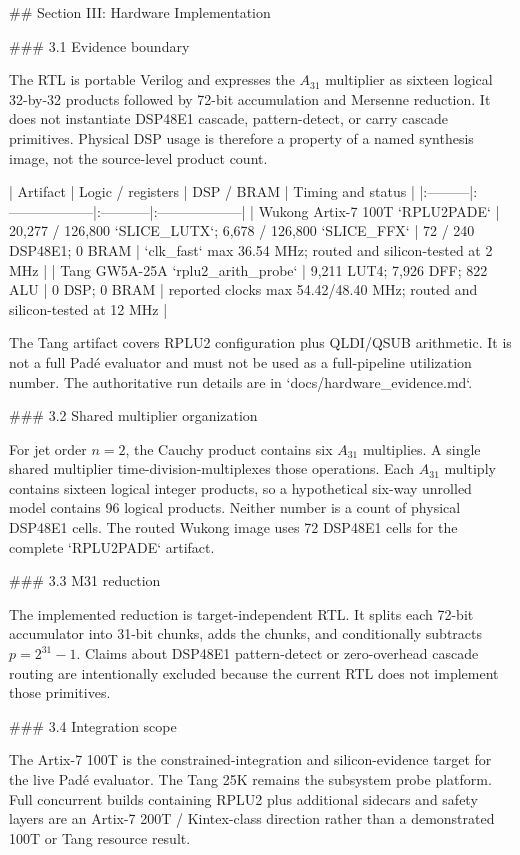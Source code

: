 ## Section III: Hardware Implementation

### 3.1 Evidence boundary

The RTL is portable Verilog and expresses the $A_{31}$ multiplier as sixteen
logical 32-by-32 products followed by 72-bit accumulation and Mersenne
reduction. It does not instantiate DSP48E1 cascade, pattern-detect, or carry
cascade primitives. Physical DSP usage is therefore a property of a named
synthesis image, not the source-level product count.

| Artifact | Logic / registers | DSP / BRAM | Timing and status |
|:---------|:------------------|:-----------|:------------------|
| Wukong Artix-7 100T `RPLU2PADE` | 20,277 / 126,800 `SLICE_LUTX`; 6,678 / 126,800 `SLICE_FFX` | 72 / 240 DSP48E1; 0 BRAM | `clk_fast` max 36.54 MHz; routed and silicon-tested at 2 MHz |
| Tang GW5A-25A `rplu2_arith_probe` | 9,211 LUT4; 7,926 DFF; 822 ALU | 0 DSP; 0 BRAM | reported clocks max 54.42/48.40 MHz; routed and silicon-tested at 12 MHz |

The Tang artifact covers RPLU2 configuration plus QLDI/QSUB arithmetic. It is
not a full Padé evaluator and must not be used as a full-pipeline utilization
number. The authoritative run details are in `docs/hardware_evidence.md`.

### 3.2 Shared multiplier organization

For jet order $n=2$, the Cauchy product contains six $A_{31}$ multiplies. A
single shared multiplier time-division-multiplexes those operations. Each
$A_{31}$ multiply contains sixteen logical integer products, so a hypothetical
six-way unrolled model contains 96 logical products. Neither number is a count
of physical DSP48E1 cells. The routed Wukong image uses 72 DSP48E1 cells for
the complete `RPLU2PADE` artifact.

### 3.3 M31 reduction

The implemented reduction is target-independent RTL. It splits each 72-bit
accumulator into 31-bit chunks, adds the chunks, and conditionally subtracts
$p=2^{31}-1$. Claims about DSP48E1 pattern-detect or zero-overhead cascade
routing are intentionally excluded because the current RTL does not implement
those primitives.

### 3.4 Integration scope

The Artix-7 100T is the constrained-integration and silicon-evidence target for
the live Padé evaluator. The Tang 25K remains the subsystem probe platform.
Full concurrent builds containing RPLU2 plus additional sidecars and safety
layers are an Artix-7 200T / Kintex-class direction rather than a demonstrated
100T or Tang resource result.
